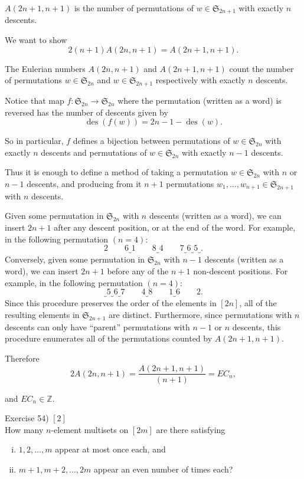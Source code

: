 \documentclass{article}
\newenvironment{problem}[2][Problem]{\begin{trivlist}
\item[\hskip \labelsep {\bfseries #1}\hskip \labelsep {\bfseries #2.}]}{\end{trivlist}}
\newenvironment{solution}[1][Solution.]{\begin{trivlist}
\item[\hskip \labelsep {\bfseries #1}]}{\end{trivlist}}
\begin{document}
\begin{solution} \text{} \\
  $A(2n + 1, n + 1)$ is the number of permutations of
  $w \in \mathfrak S_{2n + 1}$ with exactly $n$ descents.

  We want to show \[
    2(n + 1)A(2n, n + 1) = A(2n + 1, n + 1).
  \]

  The Eulerian numbers $A(2n, n + 1)$ and $A(2n + 1, n + 1)$ count the number of
  permutations $w \in \mathfrak S_{2n}$ and $w \in \mathfrak S_{2n + 1}$
  respectively with exactly $n$ descents.

  Notice that map
  $f\colon \mathfrak S_{2n} \rightarrow \mathfrak S_{2n}$ where the permutation
  (written as a word) is reversed has the number of descents given by \[
    \operatorname{des}(f(w)) = 2n - 1 - \operatorname{des}(w).
  \]

  So in particular, $f$ defines a bijection between
  permutations of $w \in \mathfrak S_{2n}$ with exactly $n$ descents and
  permutations of $w \in \mathfrak S_{2n}$ with exactly $n - 1$ descents.

  Thus it is enough to define a method of taking a permutation
  $w \in \mathfrak S_{2n}$ with $n$ or $n - 1$ descents, and producing from
  it $n + 1$ permutations $w_1, \hdots, w_{n + 1} \in \mathfrak S_{2n + 1}$
  with $n$ descents.

  Given some permutation in $\mathfrak S_{2n}$ with $n$ descents
  (written as a word), we can insert $2n + 1$ after any descent position, or at
  the end of the word. For example, in the following permutation $(n = 4)$:
  \[
    2\quad\quad6\underbrace{}1\quad\quad8\underbrace{}4\quad\quad7\underbrace{}6\underbrace{}5\underbrace{}.
  \]
  Conversely, given some permutation in $\mathfrak S_{2n}$ with $n - 1$ descents
  (written as a word), we can insert $2n + 1$ before any of the $n + 1$
  non-descent positions.
  For example, in the following permutation $(n = 4)$:
  \[
    \underbrace{}5\underbrace{}6\underbrace{}7\quad\quad4\underbrace{}8\quad\quad1\underbrace{}6\quad\quad2.
  \]
  Since this procedure preserves the order of the elements in $[2n]$, all of the
  resulting elements in $\mathfrak S_{2n + 1}$ are distinct. Furthermore,
  since permutations with $n$ descents can only have ``parent'' permutations
  with $n-1$ or $n$ descents, this procedure enumerates all of the permutations
  counted by $A(2n + 1, n + 1)$.

  Therefore \[
    2A(2n, n + 1) = \frac{A(2n + 1, n + 1)}{(n + 1)} = EC_n,
  \]
\end{solution} and $EC_n \in \mathbb Z$.
\pagebreak
\begin{problem}{4} (Exercise 54) $[2]$ \\
  How many $n$-element multisets on $[2m]$ are there satisfying
  \begin{enumerate}[(i)]
    \item $1, 2, \hdots, m$ appear at most once each, and
    \item $m+1, m+2, \hdots, 2m$ appear an even number of times each?
  \end{enumerate}
\end{problem}
\end{document}
